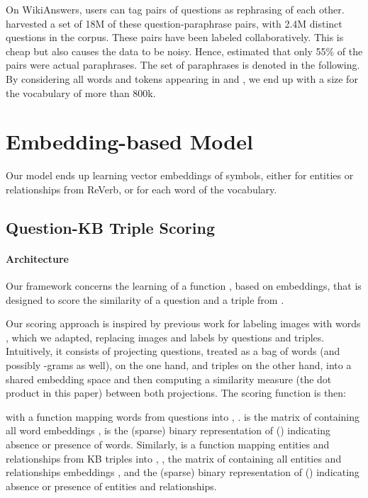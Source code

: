 \documentclass[runningheads,a4paper]{llncs}
\newcommand{\rv}{{\sc ReVerb}\xspace}
\newcommand{\wk}{{\sc WikiAnswers}\xspace}
\begin{document}
On \wk, users can tag pairs of questions as rephrasing of each other.
\cite{paralex} harvested a set of 18M of these question-paraphrase pairs, with 2.4M distinct questions in the corpus. These pairs have been labeled collaboratively. This is cheap but also causes the data to be noisy.
Hence, \cite{paralex} estimated that only 55\% of the pairs were actual paraphrases.
The set of paraphrases is denoted  in the following.
By considering all words and tokens appearing in  and , we end up with a size for the vocabulary  of more than 800k.









\section{Embedding-based Model}
\label{sec:model}

Our model ends up learning vector embeddings of symbols, either for  entities or relationships from \rv, or for each word of the vocabulary. 



\subsection{Question-KB Triple Scoring}

\paragraph{Architecture}
Our framework concerns the learning of a function , based on embeddings, 
that is designed to score the similarity of a question   and a triple  from . 

Our scoring approach is inspired by previous work for labeling images with words \cite{wsabie},
which we adapted, replacing images and labels by questions and triples.
Intuitively, it consists of projecting questions, treated as a bag of words (and possibly -grams as well), on the one hand, and triples on the other hand, into a shared embedding space and then computing a similarity measure (the dot product in this paper) between both projections.
The scoring function is then:

with  a function mapping words from questions into , .  is the matrix of  containing all word embeddings ,  is the (sparse)
binary representation of  () indicating absence or presence of words.
Similarly,  is a function mapping entities and relationships from KB triples into , ,  the matrix of  containing all entities and relationships embeddings , and  the (sparse)
binary representation of  () indicating absence or presence of entities and relationships.
\end{document}
